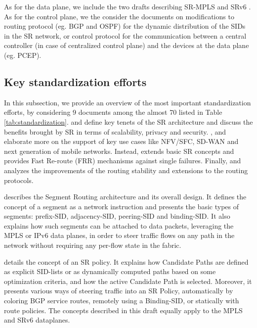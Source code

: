 As for the data plane, we include the two drafts describing SR-MPLS \cite{id-segment-routing-mpls} and SRv6 \cite{ietf-6man-segment-routing-header}.
As for the control plane, we the consider the documents on modifications to routing protocol (eg. BGP and OSPF) for the dynamic distribution of the SIDs in the SR network, or control protocol for the communication between a central controller (in case of centralized control plane) and the devices at the data plane (eg. PCEP).


\subsection{Key standardization efforts}
In this subsection, we provide an overview of the most important standardization efforts, by considering 9 documents among the almost 70 listed in Table \ref{tab:standardization}. \cite{rfc8402} and \cite{id-segment-routing-policy} define key tenets of the SR architecture and discuss the benefits brought by SR in terms of scalability, privacy and security. \cite{id-sr-service-programming}, \cite{id-sr-for-sdwan} and  \cite{id-srv6-mobile-uplane} elaborate more on the support of key use cases like NFV/SFC, SD-WAN and next generation of mobile networks. Instead, \cite{id-srv6-network-prog} extends basic SR concepts and \cite{id-segment-routing-ti-lfa} provides Fast Re-route (FRR) mechanisms against single failures. Finally,  
\cite{id-segment-routing-uloop} and \cite{ietf-lsr-flex-algo} analyzes the improvements of the routing stability and extensions to the routing protocols.

\cite{rfc8402} describes the Segment Routing architecture and its overall design. It defines the concept of a segment as a network instruction and presents the basic types of segments: prefix-SID, adjacency-SID, peering-SID and binding-SID. It also explains how such segments can be attached to data packets, leveraging the MPLS or IPv6 data planes, in order to steer traffic flows on any path in the network without requiring any per-flow state in the fabric.

\cite{id-segment-routing-policy} details the concept of an SR policy. It explains how Candidate Paths are defined as explicit SID-lists or as dynamically computed paths based on some optimization criteria, and how the active Candidate Path is selected. Moreover, it presents various ways of steering traffic into an SR Policy, automatically by coloring BGP service routes, remotely using a Binding-SID, or statically with route policies. The concepts described in this draft equally apply to the MPLS and SRv6 dataplanes.

